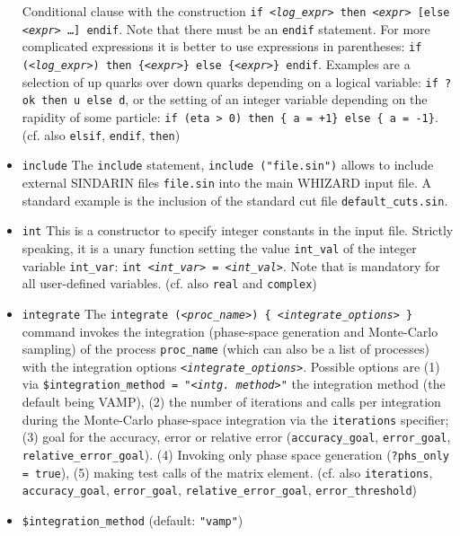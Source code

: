 \documentclass[12pt]{book}
\newcommand{\ttt}[1]{\texttt{#1}}
\begin{document}
\begin{itemize}
Conditional clause with the construction \ttt{if {\em <log\_expr>} then
{\em <expr>} [else {\em <expr>} \ldots] endif}. Note that there must be an
\ttt{endif}  statement. For more complicated expressions it is better
to use expressions in parentheses: \ttt{if ({\em <log\_expr>}) then
\{{\em <expr>}\} else \{{\em <expr>}\} endif}. Examples are a selection of up quarks
over down quarks depending on a logical variable: \ttt{if ?ok then u
  else d}, or the setting of an integer variable depending on the
rapidity of some particle: \ttt{if (eta > 0) then \{ a = +1\} else
\{ a = -1\}}. (cf. also \ttt{elsif}, \ttt{endif}, \ttt{then})
\item
\ttt{include} \newline
The \ttt{include} statement, \ttt{include ("file.sin")} allows to
include external SINDARIN files \ttt{file.sin} into the main WHIZARD
input file. A standard example is the inclusion of the standard cut
file \ttt{default\_cuts.sin}.
\item
\ttt{int} \newline
This is a constructor to specify integer constants in the input
file. Strictly speaking, it is a unary function setting the value
\ttt{int\_val} of the integer variable \ttt{int\_var}: 
\ttt{int {\em <int\_var>} = {\em <int\_val>}}. Note that is mandatory for all
user-defined variables. (cf. also \ttt{real} and \ttt{complex})
\item
\ttt{integrate} \newline
The \ttt{integrate ({\em <proc\_name>}) \{ {\em <integrate\_options>} \}} command
invokes the integration (phase-space generation and Monte-Carlo
sampling) of the process \ttt{proc\_name} (which can also be a list of
processes) with the integration options
\ttt{{\em <integrate\_options>}}. Possible options are (1) via
\ttt{\$integration\_method = "{\em <intg. method>}"} the integration
method (the default being VAMP), (2) the number of iterations and
calls per integration during the Monte-Carlo phase-space integration
via the \ttt{iterations} specifier; (3) goal for the
accuracy, error or relative error (\ttt{accuracy\_goal},
\ttt{error\_goal}, \ttt{relative\_error\_goal}). (4) Invoking only
phase space generation (\ttt{?phs\_only = true}), (5) making test
calls of the matrix element. (cf. also \ttt{iterations},
\ttt{accuracy\_goal}, \ttt{error\_goal}, \ttt{relative\_error\_goal},
\ttt{error\_threshold}) 
\item
\ttt{\$integration\_method} \qquad (default: \ttt{"vamp"}) \newline

\end{itemize}
\end{document}
